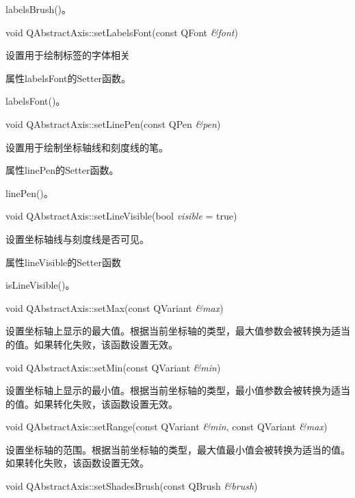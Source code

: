 \begin{seeAlso}
labelsBrush()。
\end{seeAlso}

void QAbstractAxis::setLabelsFont(const QFont \emph{\&font}) 

设置用于绘制标签的字体相关 

\begin{notice}
属性labelsFont的Setter函数。
\end{notice}
    
\begin{seeAlso}
labelsFont()。
\end{seeAlso}
    
void QAbstractAxis::setLinePen(const QPen \emph{\&pen}) 

设置用于绘制坐标轴线和刻度线的笔。 


\begin{notice}
属性linePen的Setter函数。
\end{notice}
 
\begin{seeAlso}
linePen()。
\end{seeAlso}

void QAbstractAxis::setLineVisible(bool \emph{visible} = true) 

设置坐标轴线与刻度线是否可见。 

\begin{notice}
属性lineVisible的Setter函数
\end{notice}
     
\begin{seeAlso}
isLineVisible()。
\end{seeAlso}

void QAbstractAxis::setMax(const QVariant \emph{\&max}) 

设置坐标轴上显示的最大值。根据当前坐标轴的类型，最大值参数会被转换为适当的值。如果转化失败，该函数设置无效。

void QAbstractAxis::setMin(const QVariant \emph{\&min}) 

设置坐标轴上显示的最小值。根据当前坐标轴的类型，最小值参数会被转换为适当的值。如果转化失败，该函数设置无效。

void QAbstractAxis::setRange(const QVariant \emph{\&min}, const QVariant
\emph{\&max}) 

设置坐标轴的范围。根据当前坐标轴的类型，最大值最小值会被转换为适当的值。如果转化失败，该函数设置无效。

void QAbstractAxis::setShadesBrush(const QBrush \emph{\&brush})

